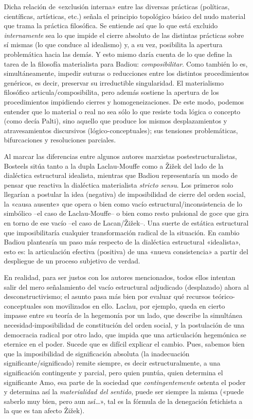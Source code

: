 Dicha relación de «exclusión interna» entre las diversas prácticas (políticas, científicas, artísticas, etc.) señala el principio topológico básico del nudo material que trama la práctica filosófica. Se entiende así que lo que está excluido \emph{internamente} sea lo que impide el cierre absoluto de las distintas prácticas sobre sí mismas (lo que conduce al idealismo) y, a su vez, posibilita la apertura problemática hacia las demás. Y esto mismo daría cuenta de lo que define la tarea de la filosofía materialista para Badiou: \emph{composibilitar}. Como también lo es, simultáneamente, impedir suturas o reducciones entre los distintos procedimientos genéricos, es decir, preservar su irreductible singularidad. El materialismo filosófico articula/composibilita, pero además sostiene la apertura de los procedimientos impidiendo cierres y homogeneizaciones. De este modo, podemos entender que lo material o real no sea sólo lo que resiste toda lógica o concepto (como decía Palti), sino aquello que produce los mismos desplazamientos y atravesamientos discursivos (lógico-conceptuales); sus tensiones problemáticas, bifurcaciones y resoluciones parciales.

Al marcar las diferencias entre algunos autores marxistas postestructuralistas, Bosteels sitúa tanto a la dupla Laclau-Mouffe como a Žižek del lado de la dialéctica estructural idealista, mientras que Badiou representaría un modo de pensar que reactiva la dialéctica materialista \emph{stricto sensu}. Los primeros solo llegarían a postular la idea (negativa) de imposibilidad de cierre del orden social, la «causa ausente» que opera o bien como vacío estructural/inconsistencia de lo simbólico --el caso de Laclau-Mouffe-- o bien como resto pulsional de goce que gira en torno de ese vacío --el caso de Lacan/Žižek--. Una suerte de estática estructural que imposibilitaría cualquier transformación radical de la situación. En cambio Badiou plantearía un paso más respecto de la dialéctica estructural «idealista», esto es: la articulación efectiva (positiva) de una «nueva consistencia» a partir del despliegue de un proceso subjetivo de verdad.

En realidad, para ser justos con los autores mencionados, todos ellos intentan salir del mero señalamiento del vacío estructural adjudicado (desplazado) ahora al desconstructivismo; el asunto pasa más bien por evaluar qué recursos teórico-conceptuales son movilizados en ello. Laclau, por ejemplo, queda en cierto impasse entre su teoría de la hegemonía por un lado, que describe la simultánea necesidad-imposibilidad de constitución del orden social, y la postulación de una democracia radical por otro lado, que impida que una articulación hegemónica se eternice en el poder. Sucede que es difícil explicar el cambio. Pues, sabemos bien que la imposibilidad de significación absoluta (la inadecuación significante/significado) remite siempre, es decir estructuralmente, a una significación contingente y parcial, pero quien puntúa, quien determina el significante Amo, esa parte de la sociedad que \emph{contingentemente} ostenta el poder y determina así la \emph{materialidad del sentido}, puede ser siempre la misma («puede saberlo muy bien, pero aun así\ldots», tal es la fórmula de la denegación fetichista a la que es tan afecto Žižek).

